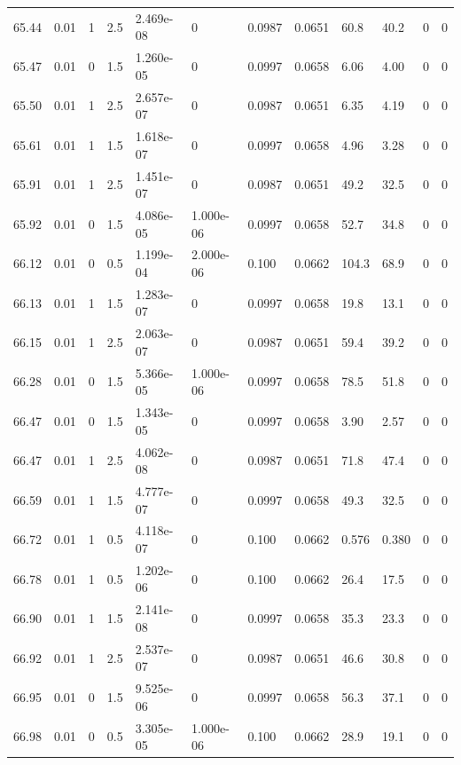 \documentclass[preview]{standalone}
\begin{document}
{{{{{{{{{{{{{{{\begin{tabular}{L{1.2cm}C{1.2cm} C{0.3cm}C{0.5cm} C{1.4cm}C{1.4cm} C{1.4cm}C{1.4cm} C{1.6cm}C{1.6cm} C{1.6cm}C{1.6cm}}
  65.44  &  0.01  & 1     & 2.5 &  2.469e-08  & 0  &  0.0987&   0.0651& 60.8 & 40.2   &  0 & 0  \\ 
  65.47  &  0.01  & 0     & 1.5 &  1.260e-05  & 0  &  0.0997&   0.0658& 6.06 & 4.00   &  0 & 0  \\ 
  65.50  &  0.01  & 1     & 2.5 &  2.657e-07  & 0  &  0.0987&   0.0651& 6.35 & 4.19   &  0 & 0  \\ 
  65.61  &  0.01  & 1     & 1.5 &  1.618e-07  & 0  &  0.0997&   0.0658& 4.96 & 3.28   &  0 & 0  \\ 
  65.91  &  0.01  & 1     & 2.5 &  1.451e-07  & 0  &  0.0987&   0.0651& 49.2 & 32.5   &  0 & 0  \\ 
  65.92  &  0.01  & 0     & 1.5 &  4.086e-05  & 1.000e-06  &  0.0997&   0.0658& 52.7 & 34.8   &  0 & 0  \\ 
  66.12  &  0.01  & 0     & 0.5 &  1.199e-04  & 2.000e-06  &  0.100&   0.0662& 104.3 & 68.9   &  0 & 0  \\ 
  66.13  &  0.01  & 1     & 1.5 &  1.283e-07  & 0  &  0.0997&   0.0658& 19.8 & 13.1   &  0 & 0  \\ 
  66.15  &  0.01  & 1     & 2.5 &  2.063e-07  & 0  &  0.0987&   0.0651& 59.4 & 39.2   &  0 & 0  \\ 
  66.28  &  0.01  & 0     & 1.5 &  5.366e-05  & 1.000e-06  &  0.0997&   0.0658& 78.5 & 51.8   &  0 & 0  \\ 
  66.47  &  0.01  & 0     & 1.5 &  1.343e-05  & 0  &  0.0997&   0.0658& 3.90 & 2.57   &  0 & 0  \\ 
  66.47  &  0.01  & 1     & 2.5 &  4.062e-08  & 0  &  0.0987&   0.0651& 71.8 & 47.4   &  0 & 0  \\ 
  66.59  &  0.01  & 1     & 1.5 &  4.777e-07  & 0  &  0.0997&   0.0658& 49.3 & 32.5   &  0 & 0  \\ 
  66.72  &  0.01  & 1     & 0.5 &  4.118e-07  & 0  &  0.100&   0.0662& 0.576 & 0.380   &  0 & 0  \\ 
  66.78  &  0.01  & 1     & 0.5 &  1.202e-06  & 0  &  0.100&   0.0662& 26.4 & 17.5   &  0 & 0  \\ 
  66.90  &  0.01  & 1     & 1.5 &  2.141e-08  & 0  &  0.0997&   0.0658& 35.3 & 23.3   &  0 & 0  \\ 
  66.92  &  0.01  & 1     & 2.5 &  2.537e-07  & 0  &  0.0987&   0.0651& 46.6 & 30.8   &  0 & 0  \\ 
  66.95  &  0.01  & 0     & 1.5 &  9.525e-06  & 0  &  0.0997&   0.0658& 56.3 & 37.1   &  0 & 0  \\ 
  66.98  &  0.01  & 0     & 0.5 &  3.305e-05  & 1.000e-06  &  0.100&   0.0662& 28.9 & 19.1   &  0 & 0  \\ 

\end{tabular}}}}}}}}}}}}}}}}
\end{document}
